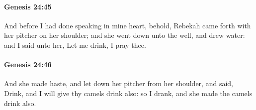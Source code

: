 		\paragraph{Genesis 24:45} %
			\label{GENESIS-24-45}

			And before I had done speaking in mine heart, behold, Rebekah came forth with her pitcher on her shoulder; and she went down unto the well, and drew water: and I said unto her, Let me drink, I pray thee.


		\paragraph{Genesis 24:46} %
			\label{GENESIS-24-46}

			And she made haste, and let down her pitcher from her shoulder, and said, Drink, and I will give thy camels drink also: so I drank, and she made the camels drink also.


